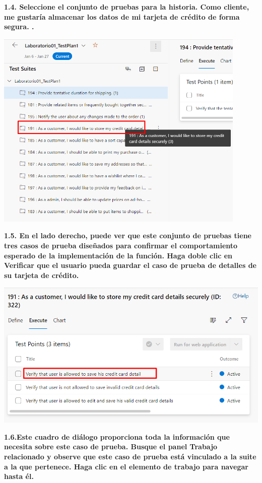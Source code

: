 \documentclass{article}
\begin{document}
\textbf{1.4.  Seleccione el conjunto de pruebas para la historia. Como cliente, me gustaría almacenar los datos de mi tarjeta de crédito de forma segura. .}

    \begin{center}
		\includegraphics[width=12cm]{./images/1.4} 
	\end{center}
	
\newpage
\textbf{1.5.  En el lado derecho, puede ver que este conjunto de pruebas tiene tres casos de prueba diseñados para confirmar el comportamiento esperado de la implementación de la función. Haga doble clic en Verificar que el usuario pueda guardar el caso de prueba de detalles de su tarjeta de crédito.}

    \begin{center}
		\includegraphics[width=14cm]{./images/1.5} 
	\end{center}
		
\textbf{1.6.Este cuadro de diálogo proporciona toda la información que necesita sobre este caso de prueba. Busque el panel Trabajo relacionado y observe que este caso de prueba está vinculado a la suite a la que pertenece. Haga clic en el elemento de trabajo para navegar hasta él.
}
\end{document}
